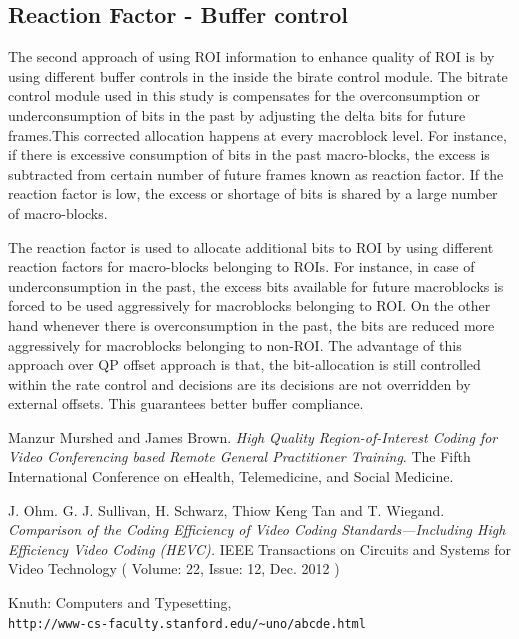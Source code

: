 \documentclass[11pt]{article} %
\begin{document}
\subsection{Reaction Factor - Buffer control} 
The second approach of using ROI information to enhance quality of ROI is by using different buffer controls in the inside the birate control module. The bitrate control module used in this study is compensates for the overconsumption or underconsumption of bits in the past by adjusting the delta bits for future frames.This corrected allocation happens at every macroblock level. For instance, if there is excessive consumption of bits in the past macro-blocks, the excess is subtracted from certain number of future frames known as reaction factor. If the reaction factor is low, the excess or shortage of bits is shared by a large number of macro-blocks.

The reaction factor is used to allocate additional bits to ROI by using different reaction factors for macro-blocks belonging to ROIs. For instance, in case of underconsumption in the past, the excess bits available for future macroblocks is forced to be used aggressively for macroblocks belonging to ROI. On the other hand whenever there is overconsumption in the past, the bits are reduced more aggressively for macroblocks belonging to non-ROI. The advantage of this approach over QP offset approach is that, the bit-allocation is still controlled within the rate control and decisions are its decisions are not overridden by external offsets. This guarantees better buffer compliance. 
%
%
%
%
%
\clearpage
\begin{thebibliography}{9}
Manzur Murshed and James Brown. 
\textit{High Quality Region-of-Interest Coding for Video Conferencing based Remote General Practitioner Training}. 
The Fifth International Conference on eHealth, Telemedicine, and Social Medicine.
 
J. Ohm. G. J. Sullivan, H. Schwarz, Thiow Keng Tan and T. Wiegand.
\textit{Comparison of the Coding Efficiency of Video Coding Standards—Including High Efficiency Video Coding (HEVC).}
 IEEE Transactions on Circuits and Systems for Video Technology ( Volume: 22, Issue: 12, Dec. 2012 )
 
Knuth: Computers and Typesetting,
\\\texttt{http://www-cs-faculty.stanford.edu/\~{}uno/abcde.html}
\end{thebibliography}
\end{document}
